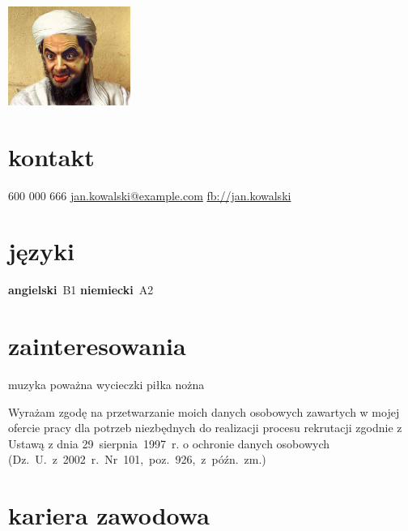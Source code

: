 \documentclass[]{konserw-cv} %
\begin{document}


\begin{aside} %
\includegraphics[width=4cm, keepaspectratio=true]{foto}
\section{kontakt}
600 000 666
\href{mailto:jan.kowalski@example.com}{jan.kowalski@example.com} 
\href{https://www.facebook.com/jan.kowalski}{fb://jan.kowalski}
\section{języki}
{\bf angielski}~B1
{\bf niemiecki}~A2
\section{zainteresowania}
muzyka poważna
wycieczki
piłka nożna
\end{aside}

\begin{klauzula}
Wyrażam zgodę na przetwarzanie moich danych osobowych zawartych w mojej ofercie pracy dla potrzeb niezbędnych do realizacji procesu rekrutacji zgodnie z Ustawą z dnia 29~sierpnia~1997~r. o ochronie danych osobowych  (Dz.~U.~z~2002~r.~Nr~101,~poz.~926,~z~późn.~zm.)
\end{klauzula}


\section{kariera zawodowa}
\end{document}
